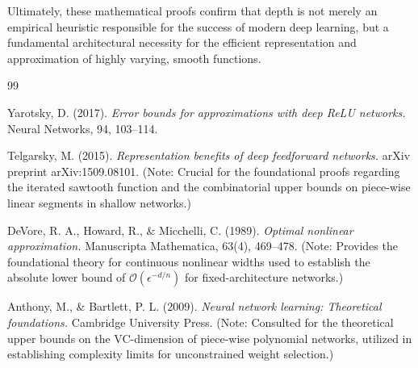\documentclass[12pt]{article}
\begin{document}
Ultimately, these mathematical proofs confirm that depth is not merely an empirical heuristic responsible for the success of modern deep learning, but a fundamental architectural necessity for the efficient representation and approximation of highly varying, smooth functions.

\begin{thebibliography}{99}

Yarotsky, D. (2017). 
\textit{Error bounds for approximations with deep ReLU networks.} 
Neural Networks, 94, 103--114.

Telgarsky, M. (2015). 
\textit{Representation benefits of deep feedforward networks.} 
arXiv preprint arXiv:1509.08101. 
(Note: Crucial for the foundational proofs regarding the iterated sawtooth function and the combinatorial upper bounds on piece-wise linear segments in shallow networks.)

DeVore, R. A., Howard, R., \& Micchelli, C. (1989). 
\textit{Optimal nonlinear approximation.} 
Manuscripta Mathematica, 63(4), 469--478.
(Note: Provides the foundational theory for continuous nonlinear widths used to establish the absolute lower bound of $\mathcal{O}(\epsilon^{-d/n})$ for fixed-architecture networks.)

Anthony, M., \& Bartlett, P. L. (2009). 
\textit{Neural network learning: Theoretical foundations.} 
Cambridge University Press.
(Note: Consulted for the theoretical upper bounds on the VC-dimension of piece-wise polynomial networks, utilized in establishing complexity limits for unconstrained weight selection.)

\end{thebibliography}
\end{document}
